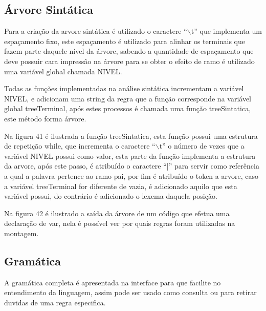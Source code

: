\documentclass[12pt,oneside,a4paper,chapter=TITLE,section=TITLE,sumario=tradicional]{abntex2}
\begin{document}
\subsection{Árvore Sintática}
\label{subsec:arvore}

Para a criação da arvore sintática é utilizado o caractere “$\backslash$t” que implementa um espaçamento fixo, este espaçamento é utilizado para alinhar os terminais que fazem parte daquele nível da árvore,  sabendo a quantidade de espaçamento que deve possuir cara impressão na árvore para se obter o efeito de ramo é utilizado uma variável global chamada NIVEL.

Todas as funções implementadas na análise sintática incrementam a variável NIVEL, e adicionam uma string da regra que a função corresponde na variável global treeTerminal, após estes processos é chamada uma função treeSintatica, este método forma árvore.

Na figura 41 é ilustrada a função treeSintatica, esta função possui uma estrutura de repetição while, que incrementa o caractere “$\backslash$t” o número de vezes que a variável NIVEL possui como valor, esta parte da função implementa a estrutura da arvore, após este passo, é atribuído o caractere “|” para servir como referência a qual a palavra pertence ao ramo pai, por fim é atribuído o token a arvore, caso a variável treeTerminal for diferente de vazia, é adicionado aquilo que esta variável possui, do contrário é adicionado o lexema daquela posição. 

\begin{figure}[htb]
\end{figure} 

Na figura 42 é ilustrado a saída da árvore de um código que efetua uma declaração de var, nela é possível ver por quais regras foram utilizadas na montagem. 

\begin{figure}[htb]
\end{figure} 

\subsection{Gramática}
\label{subsec:gramatica}

A gramática completa é apresentada na interface para que facilite no entendimento da linguagem, assim pode ser usado como consulta ou para retirar duvidas de uma regra especifica. 
\end{document}
